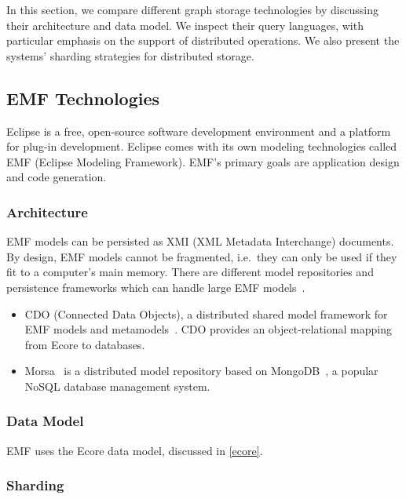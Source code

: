 In this section, we compare different graph storage technologies by discussing their architecture and data model. We inspect their query languages, with particular emphasis on the support of distributed operations. We also present the systems' sharding strategies for distributed storage.


\subsection{EMF Technologies}
\label{emf}

Eclipse is a free, open-source software development environment and a platform for plug-in development. Eclipse comes with its own modeling technologies called EMF (Eclipse Modeling Framework). EMF's primary goals are application design and code generation.

\subsubsection{Architecture}

EMF models can be persisted as XMI (XML Metadata Interchange) documents. By design, EMF models cannot be fragmented, i.e.\ they can only be used if they fit to a computer's main memory. There are different model repositories and persistence frameworks which can handle large EMF models~\cite{Scheidgen:2012:ATM:2404962.2404974}. 

\begin{itemize}
  \item CDO (Connected Data Objects), a distributed shared model framework for EMF models and metamodels~\cite{CDO}. CDO provides an object-relational mapping from Ecore to databases.
  \item Morsa~\cite{Pagan:2011:MSA:2050655.2050665} is a distributed model repository based on MongoDB~\cite{MongoDB}, a popular NoSQL database management system.
\end{itemize}
 
\subsubsection{Data Model}

EMF uses the Ecore data model, discussed in \autoref{ecore}. 

\subsubsection{Sharding}


